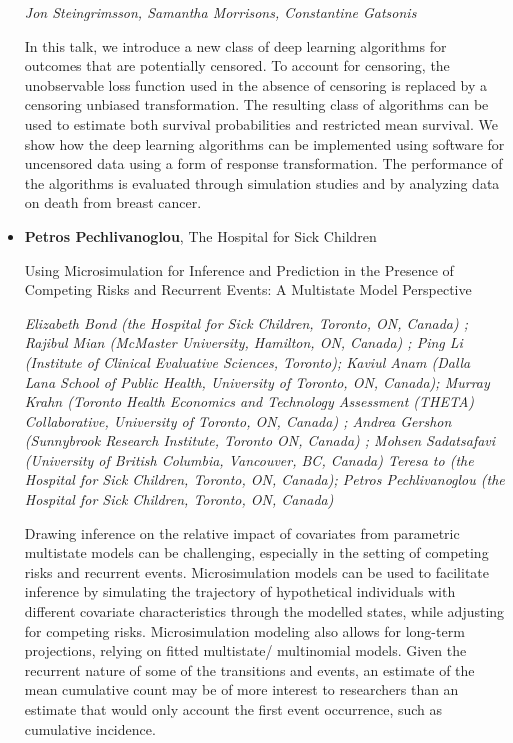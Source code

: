 \begin{itemize}
\emph{\footnotesize Jon Steingrimsson, Samantha Morrisons, Constantine Gatsonis}

In this talk, we introduce a new class of deep learning algorithms for outcomes that are potentially censored. To account for censoring, the unobservable loss function used in the absence of censoring is replaced by a censoring unbiased transformation. The resulting class of algorithms can be used to estimate both survival probabilities and restricted mean survival. We show how the deep learning algorithms can be implemented using software for uncensored data using a form of response transformation. The performance of the algorithms is evaluated through simulation studies and by analyzing data on death from breast cancer.

\item \textbf{Petros Pechlivanoglou}, The Hospital for Sick Children

Using Microsimulation for Inference and Prediction in the Presence of Competing Risks and Recurrent Events: A Multistate Model Perspective

\emph{\footnotesize Elizabeth Bond (the Hospital for Sick Children, Toronto, ON, Canada) ;  Rajibul Mian (McMaster University, Hamilton, ON, Canada) ; Ping Li (Institute of Clinical Evaluative Sciences, Toronto); Kaviul Anam (Dalla Lana School of Public Health, University of Toronto,  ON, Canada); Murray Krahn (Toronto Health Economics and Technology Assessment (THETA) Collaborative, University of Toronto, ON, Canada) ; Andrea Gershon (Sunnybrook Research Institute, Toronto ON, Canada) ;  Mohsen Sadatsafavi  (University of British Columbia, Vancouver, BC, Canada) Teresa to (the Hospital for Sick Children, Toronto, ON, Canada); Petros Pechlivanoglou (the Hospital for Sick Children, Toronto, ON, Canada)}

Drawing inference on the relative impact of covariates from parametric multistate models can be challenging, especially in the setting of competing risks and recurrent events. Microsimulation models can be used to facilitate inference by simulating the trajectory of hypothetical individuals with different covariate characteristics through the modelled states, while adjusting for competing risks. Microsimulation modeling also allows for long-term projections, relying on fitted multistate/ multinomial models. Given the recurrent nature of some of the transitions and events, an estimate of the mean cumulative count may be of more interest to researchers than an estimate that would only account the first event occurrence, such as cumulative incidence.


\end{itemize}
